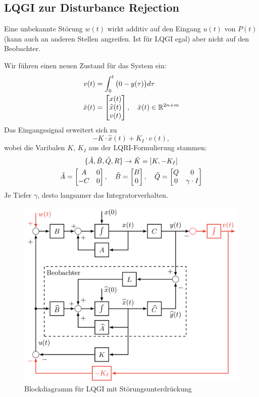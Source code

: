 \subsection{LQGI zur Disturbance Rejection}
    Eine unbekannte Störung $w(t)$ wirkt additiv auf den Eingang $u(t)$ von $P(t)$ (kann auch an anderen Stellen angreifen. Ist für LQGI egal) aber nicht auf den Beobachter.
    
    Wir führen einen neuen Zustand für das System ein:
    \begin{align*}
        v(t) &= \int_0^t \big(0-y(\tau)\big)d\tau\\
        \Tilde{x}(t) &= \begin{bmatrix}x(t)\\\widehat{x}(t)\\v(t)\end{bmatrix},\quad \Tilde{x}(t)\in\mathbb{R}^{2n+m}
    \end{align*}
    Das Eingangssignal erweitert sich zu
    \begin{equation*}
        -K\cdot\widehat{x}(t) + K_I\cdot v(t),
    \end{equation*}
    wobei die Varibalen $K,\, K_I$ aus der LQRI-Formulierung stammen:
    \begin{gather*}
        \{\Tilde{A},\Tilde{B},\Tilde{Q},R\}\rightarrow \Tilde{K}= [K,-K_I]\\
        \Tilde{A}=\begin{bmatrix}A & 0\\ -C & 0\end{bmatrix},\quad \Tilde{B} = \begin{bmatrix}B\\0\end{bmatrix},\quad \Tilde{Q} = \begin{bmatrix} Q & 0\\ 0 & \gamma\cdot I\end{bmatrix}
    \end{gather*}
    Je Tiefer $\gamma$, desto langsamer das Integratorverhalten.
    
    \begin{figure}[H]
        \centering
        \includegraphics[width = 0.7\linewidth]{images/10/LQGI_distrejec.jpeg}
        \caption{Blockdiagramm für LQGI mit Störungsunterdrückung}
    \end{figure}
    
